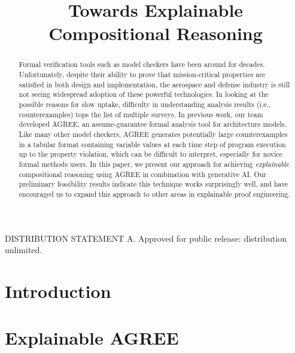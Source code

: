 \documentclass[conference]{IEEEtran}
\begin{document}
\title{Towards Explainable Compositional Reasoning}

\author{
	}



\maketitle

\begin{abstract}

Formal verification tools such as model checkers have been around for decades.  Unfortunately, despite their ability to prove that mission-critical properties are satisfied in both design and implementation, the aerospace and defense industry is still not seeing widespread adoption of these powerful technologies. 
%
In looking at the possible reasons for slow uptake, difficulty in understanding analysis results (i.e., counterexamples) tops the list of multiple surveys.
%
In previous work, our team developed AGREE, an assume-guarantee formal analysis tool for architecture models.  Like many other model checkers, AGREE generates potentially large counterexamples in a tabular format containing variable values at each time step of program execution up to the property violation, which can be difficult to interpret, especially for novice formal methods users.
In this paper, we present our approach for achieving \textit{explainable} compositional reasoning using AGREE in combination with generative AI.  Our preliminary feasibility results indicate this technique works surprisingly well, and have encouraged us to expand this approach to other areas in explainable proof engineering.  
	

\end{abstract}

DISTRIBUTION STATEMENT A. Approved for public release: distribution unlimited.

\section{Introduction}
\label{sec:introduction}


\section{Explainable AGREE}
\label{sec:agree}

\end{document}

